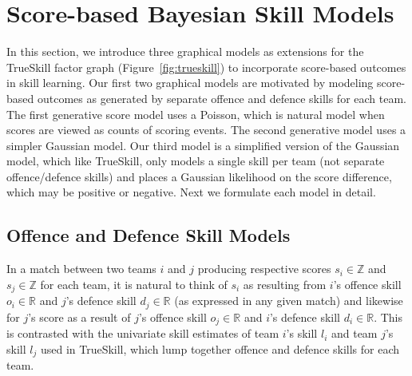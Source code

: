 \documentclass[runningheads,a4paper]{llncs}
\begin{document}
\section{Score-based Bayesian Skill Models}
\label{sec:PoissonGaussianModels}

In this section, we introduce three graphical models as extensions for
the TrueSkill factor graph (Figure~\ref{fig:trueskill}) to incorporate
score-based outcomes in skill learning.  Our first two graphical
models are motivated by modeling score-based outcomes as generated by
separate offence and defence skills for each team.  The first
generative score model uses a Poisson, which is natural model when
scores are viewed as counts of scoring events.  The second generative
model uses a simpler Gaussian model.  Our third model is a simplified
version of the Gaussian model, which like TrueSkill, only models a
single skill per team (not separate offence/defence skills) and places
a Gaussian likelihood on the score difference, which may be positive
or negative.  Next we formulate each model in detail.

\subsection{Offence and Defence Skill Models}
\label{sec:PoissonGraphicalModel}

In a match between two teams $i$ and $j$ producing respective scores
$s_i \in \mathbb{Z}$ and $s_j \in \mathbb{Z}$ for each team, it is natural to
think of $s_i$ as resulting from $i$'s offence skill $o_i \in \mathbb{R}$
and $j$'s defence skill $d_j \in \mathbb{R}$
(as expressed in any given match) and
likewise for $j$'s score as a result of $j$'s offence skill
$o_j \in \mathbb{R}$
and $i$'s defence skill $d_i \in \mathbb{R}$.  This is contrasted
with the univariate skill estimates of team $i$'s skill $l_i$
and team $j$'s skill $l_j$ used in TrueSkill, which lump together
offence and defence skills for each team.
\end{document}
